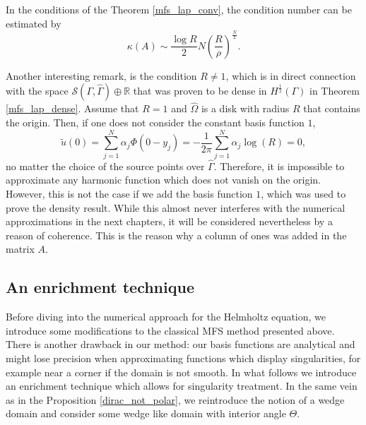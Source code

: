\begin{theorem}
    In the conditions of the Theorem \eqref{mfs_lap_conv}, the condition number can be estimated by
    \[
        \kappa(A) \sim \frac{\log R}{2}N \left(\frac{R}{\rho}\right)^{\frac{N}{2}}.
    \]
\end{theorem}
Another interesting remark, is the condition \(R \neq 1\), which is in direct connection with the space \(\mathcal{S}(\Gamma, \hat{\Gamma}) \oplus \mathbb{R}\) that was proven to be dense in \(H^\frac{1}{2}(\Gamma)\) in Theorem \eqref{mfs_lap_dense}. Assume that \(R=1\) and \(\hat{\Omega}\) is a disk with radius \(R\) that contains the origin. Then, if one does not consider the constant basis function \(1\),
\[
    \tilde{u}(0) = \sum_{j=1}^{N}\alpha_j \Phi(0-y_j) = -\frac{1}{2\pi}\sum_{j=1}^{N}\alpha_j \log(R) = 0,
\]
no matter the choice of the source points over \(\hat{\Gamma}\). Therefore, it is impossible to approximate any harmonic function which does not vanish on the origin. However, this is not the case if we add the basis function \(1\), which was used to prove the density result. While this almost never interferes with the numerical approximations in the next chapters, it will be considered nevertheless by a reason of coherence. This is the reason why a column of ones was added in the matrix \(A\).

\subsection{An enrichment technique}

Before diving into the numerical approach for the Helmholtz equation, we introduce some modifications to the classical MFS method presented above. There is another drawback in our method: our basis functions are analytical and might lose precision when approximating functions which display singularities, for example near a corner if the domain is not smooth. In what follows we introduce an enrichment technique which allows for singularity treatment. In the same vein as in the Proposition \eqref{dirac_not_polar}, we reintroduce the notion of a wedge domain and consider some wedge like domain with interior angle \(\Theta\).
    
